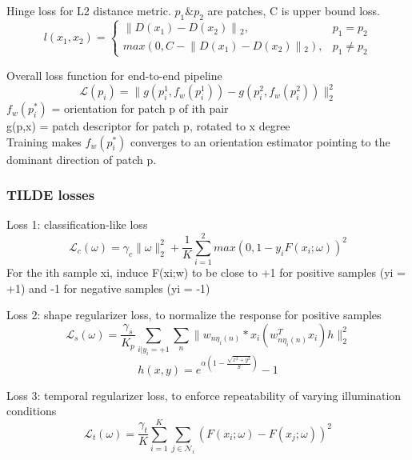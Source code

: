 Hinge loss for L2 distance metric. \(p_1 \text{\&} p_2\) are patches, C is upper bound
loss.
\[
    l(x_1,x_2) = 
    \begin{cases}
        \lVert D(x_1) - D(x_2) \rVert{}_2, & p_1=p_2 \\
        max(0, C - \lVert D(x_1) - D(x_2) \rVert{}_2), & p_1 \neq p_2
    \end{cases}
\]

Overall loss function for end-to-end pipeline
\[
    \mathcal{L}(p_i) = \lVert g(p_i^1, f_w(p_i^1)) -g(p_i^2, f_w(p_i^2))
    \rVert_2^2
\]
\(f_w(p_i^*)\) = orientation for patch p of ith pair \\
g(p,x) = patch descriptor for patch p, rotated to x degree \\
Training makes \(f_w(p_i^*)\) converges to an orientation estimator pointing to
the dominant direction of patch p.

\subsubsection{TILDE losses}

Loss 1: classification-like loss
\[
    \mathcal{L}_c(\omega) = \gamma_c \lVert\omega\rVert_2^2 + \frac{1}{K}
    \sum_{i=1}^2 max(0,1 -y_i F(x_i;\omega))^2
\]
For the ith sample xi, induce F(xi;w) to be close to +1 for positive samples
(yi = +1) and -1 for negative samples (yi = -1)

Loss 2: shape regularizer loss, to normalize the response for positive samples
\[
    \mathcal{L}_s(\omega) = \frac{\gamma_s}{K_p} \sum_{i\lvert y_i = +1} 
    \sum_{n} \lVert w_{n\eta_i(n)} * x_i (w_{n\eta_i(n)}^T x_i)h\rVert_2^2
\]
\[
    h(x,y) = e^{\alpha(1-\frac{\sqrt{x^2 + y^2}}{S})}-1
\]

Loss 3: temporal regularizer loss, to enforce repeatability of varying
illumination conditions
\[
    \mathcal{L}_t(\omega) = \frac{\gamma_t}{K} \sum_{i=1}^K
    \sum_{j\in\mathcal{N}_i} (F(x_i;\omega) - F(x_j;\omega))^2
\]
























